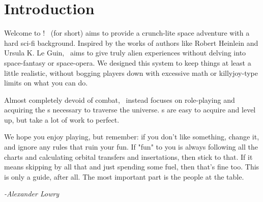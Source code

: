 \section{Introduction}

\par
Welcome to \getTitle! \getTitleShort\, (for short) aims to provide a crunch-lite space adventure with a hard sci-fi background. Inspired by the works of authors like Robert Heinlein and Ursula K. Le Guin, \getTitleShort\, aims to give truly alien experiences without delving into space-fantasy or space-opera. We designed this system to keep things at least a little realistic, without bogging players down with excessive math or killyjoy-type limits on what you can do.

\par
Almost completely devoid of combat, \getTitleShort\, instead focuses on role-playing and acquiring the \skill s necessary to traverse the universe. \skillC s are easy to acquire and level up, but take a lot of work to perfect.

\par
We hope you enjoy playing, but remember: if you don't like something, change it, and ignore any rules that ruin your fun. If "fun" to you is always following all the charts and calculating orbital transfers and insertations, then stick to that. If it means skipping by all that and just spending some fuel, then that's fine too. This is only a guide, after all. The most important part is the people at the table.

\par
\textit{-Alexander Lowry}